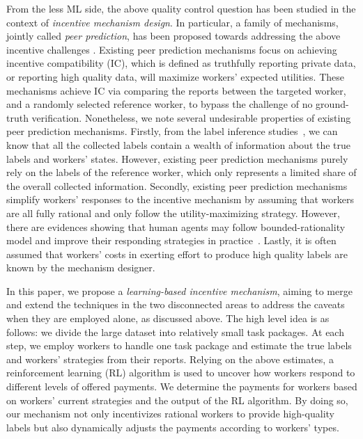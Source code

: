 From the less ML side, the above quality control question has been studied in the context of \emph{incentive mechanism design}. In particular, a family of mechanisms, jointly called \emph{peer prediction}, has been proposed towards addressing the above incentive challenges \cite{prelec2004bayesian,jurca2009mechanisms,witkowski2012peer,dasgupta2013crowdsourced}. Existing peer prediction mechanisms focus on achieving incentive compatibility (IC), which is defined as truthfully reporting private data, or reporting high quality data, will maximize workers' expected utilities. These mechanisms achieve IC via comparing the reports between the targeted worker, and a randomly selected reference worker, to bypass the challenge of no ground-truth verification.
Nonetheless, we note several undesirable properties of existing peer prediction mechanisms.
Firstly, from the label inference studies~\cite{zheng2017truth}, we can know that all the collected labels contain a wealth of information about the true labels and workers' states.
However, existing peer prediction mechanisms purely rely on the labels of the reference worker, which only represents a limited share of the overall collected information.
Secondly, existing peer prediction mechanisms simplify workers' responses to the incentive mechanism by assuming that workers are all fully rational and only follow the utility-maximizing strategy.
However, there are evidences showing that human agents may follow bounded-rationality model and improve their responding strategies in practice~\cite{simon1982models,chastain2014algorithms,gao2014trick}. Lastly, it is often assumed that workers' costs in exerting effort to produce high quality labels are known by the mechanism designer. 




In this paper, we propose a \emph{learning-based incentive mechanism}, aiming to merge and extend the techniques in the two disconnected areas to address the caveats when they are employed alone, as discussed above.
The high level idea is as follows: we divide the large dataset into relatively small task packages. At each step, we employ workers to handle one task package and estimate the true labels and workers' strategies from their reports.
Relying on the above estimates, a reinforcement learning (RL) algorithm is used to uncover how workers respond to different levels of offered payments.
We determine the payments for workers based on workers' current strategies and the output of the RL algorithm.
By doing so, our mechanism not only incentivizes rational workers to provide high-quality labels but also dynamically adjusts the payments according to workers' types.

